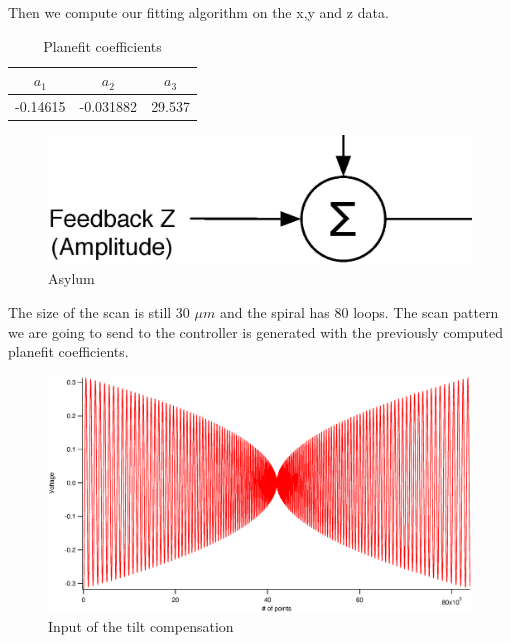 Then we compute our fitting algorithm on the x,y and z data.
\begin{table}[H]
\caption{Planefit coefficients} %
\centering %
\begin{tabular}{c c c} %
\hline\hline %
$a_1$ & $a_2$ & $a_3$ \\ [0.5ex] %
\hline %
-0.14615  & -0.031882 & 29.537 \\[1ex]

\hline %
\end{tabular}
\label{table:planefit} %
\end{table}


\begin{figure}[H]
  \centering
  \includegraphics[scale=0.4]{images/outputz.eps}
    \caption{Asylum}
  \label{outputz}
\end{figure}

The size of the scan is still 30 $\mu m$ and the spiral has 80 loops. The scan pattern we are going to send to the controller is generated with the previously computed planefit coefficients. 

\begin{figure}[H]
  \centering
  \includegraphics[scale=0.4]{images/spiralztiltout.eps}
    \caption{Input of the tilt compensation}
  \label{spiralztiltout}
\end{figure}

